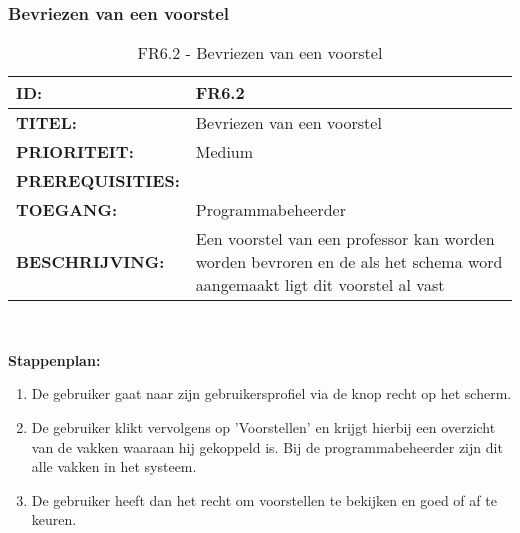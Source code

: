 \subsubsection{Bevriezen van een voorstel}
\noindent\begin{table}[H]
            \begin{tabular}{l | p{10cm}}
                \textbf{ID:} & FR6.2 \\ \hline
                \textbf{TITEL:} & Bevriezen van een voorstel\\ \hline
                \textbf{PRIORITEIT:} &  Medium \\ \hline
                \textbf{PREREQUISITIES:} & \\ \hline
                \textbf{TOEGANG:} & Programmabeheerder \\ \hline
                \textbf{BESCHRIJVING:} & Een voorstel van een professor kan worden worden bevroren en de als het schema word aangemaakt ligt dit voorstel al vast\\ 
            \end{tabular}\\
            \caption{FR6.2 - Bevriezen van een voorstel}
            \label{tab:FR6.2 - Bevriezen van een voorstel}
        \end{table}
        
\textbf{Stappenplan:}
	\begin{enumerate}
	\item De gebruiker gaat naar zijn gebruikersprofiel via de knop recht op het scherm.
	\item De gebruiker klikt vervolgens op 'Voorstellen' en krijgt hierbij een overzicht van de vakken waaraan hij gekoppeld is. Bij de programmabeheerder zijn dit alle vakken in het systeem.
	\item De gebruiker heeft dan het recht om voorstellen te bekijken en goed of af te keuren.
	\end{enumerate}	        
        
